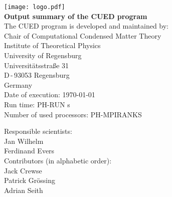 \documentclass[11pt, a4paper]{scrartcl}
\begin{document}

\begin{titlepage}
  \sffamily
  \begin{center}
{
\texttt{[image: logo.pdf]}
\\[5em]
\Huge \bfseries Output summary of the CUED program}
\\[3em]\large
The CUED program is developed and maintained by:
\\[3em]
Chair of Computational Condensed Matter Theory
  \\[0.5em]
Institute of Theoretical Physics
  \\[0.5em]
University of Regensburg
  \\[0.5em]
Universitätsstraße 31
  \\[0.5em]
D\,-\,93053 Regensburg
  \\[0.5em]
Germany
\\[3em]
Date of execution: \today
  \\[0.5em]
Run time: PH-RUN s
  \\[0.5em]
Number of used processors: PH-MPIRANKS
\\[3em]
  \end{center}{\large
  Responsible scientists:
  \\[1em]
    Jan Wilhelm
      \\[0.5em]
    Ferdinand Evers
  \\[3em]
  Contributors (in alphabetic order): 
  \\[1em]
  Jack Crewse
  \\[0.5em]
  Patrick Grössing
  \\[0.5em]
  Adrian Seith
  }
\end{titlepage}







\pagestyle{plain}




\tableofcontents


\pagestyle{fancy}
\end{document}
